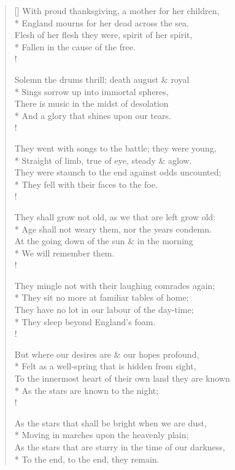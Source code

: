 \documentclass[MAIN]{subfiles}
\begin{document}
\settowidth{\versewidth}{With proud thanksgiving, a mother for her children,}
\begin{verse}[\versewidth]
With proud thanksgiving, a mother for her children,\\*
\vin England mourns for her dead across the sea.\\
Flesh of her flesh they were, spirit of her spirit,\\*
\vin Fallen in the cause of the free.\\!

Solemn the drums thrill; death august \& royal\\*
\vin Sings sorrow up into immortal spheres,\\
There is music in the midst of desolation\\*
\vin And a glory that shines upon our tears.\\!

They went with songs to the battle; they were young,\\*
\vin Straight of limb, true of eye, steady \& aglow.\\
They were staunch to the end against odds uncounted;\\*
\vin They fell with their faces to the foe.\\!

They shall grow not old, as we that are left grow old:\\*
\vin Age shall not weary them, nor the years condemn.\\
At the going down of the sun \& in the morning\\*
\vin We will remember them.\\!

They mingle not with their laughing comrades again;\\*
\vin They sit no more at familiar tables of home;\\
They have no lot in our labour of the day-time;\\*
\vin They sleep beyond England's foam.\\!

But where our desires are \& our hopes profound,\\*
\vin Felt as a well-spring that is hidden from sight,\\
To the innermost heart of their own land they are known\\*
\vin As the stars are known to the night;\\!

As the stars that shall be bright when we are dust,\\*
\vin Moving in marches upon the heavenly plain;\\
As the stars that are starry in the time of our darkness,\\*
\vin To the end, to the end, they remain.
\end{verse}
\end{document}

